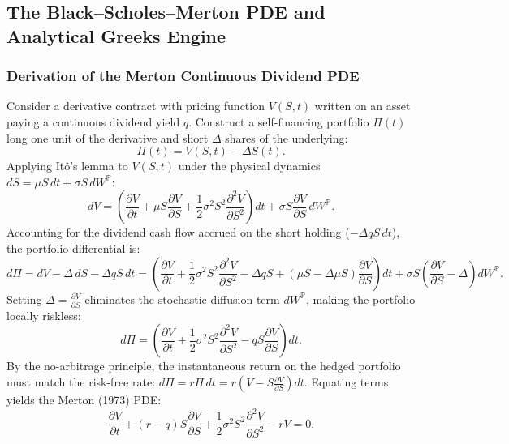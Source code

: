 \documentclass{article}
\theoremstyle{plain}
\theoremstyle{definition}
\theoremstyle{remark}
\begin{document}
\subsection{The Black--Scholes--Merton PDE and Analytical Greeks Engine}

\subsubsection{Derivation of the Merton Continuous Dividend PDE}
Consider a derivative contract with pricing function $V(S, t)$ written on an asset paying a continuous dividend yield $q$. Construct a self-financing portfolio $\Pi(t)$ long one unit of the derivative and short $\Delta$ shares of the underlying:
\begin{equation}
\Pi(t) = V(S, t) - \Delta S(t).
\end{equation}
Applying It\^o's lemma to $V(S,t)$ under the physical dynamics $dS = \mu S\,dt + \sigma S\,dW^\mathbb{P}$:
\begin{equation}
dV = \left(\frac{\partial V}{\partial t} + \mu S\frac{\partial V}{\partial S} + \frac{1}{2}\sigma^2 S^2\frac{\partial^2 V}{\partial S^2}\right)dt + \sigma S\frac{\partial V}{\partial S}\,dW^\mathbb{P}.
\end{equation}
Accounting for the dividend cash flow accrued on the short holding ($-\Delta qS\,dt$), the portfolio differential is:
\begin{equation}
d\Pi = dV - \Delta\,dS - \Delta q S\,dt = \left(\frac{\partial V}{\partial t} + \frac{1}{2}\sigma^2 S^2\frac{\partial^2 V}{\partial S^2} - \Delta q S + (\mu S - \Delta \mu S)\frac{\partial V}{\partial S}\right)dt + \sigma S\left(\frac{\partial V}{\partial S} - \Delta\right)dW^\mathbb{P}.
\end{equation}
Setting $\Delta = \frac{\partial V}{\partial S}$ eliminates the stochastic diffusion term $dW^\mathbb{P}$, making the portfolio locally riskless:
\begin{equation}
d\Pi = \left(\frac{\partial V}{\partial t} + \frac{1}{2}\sigma^2 S^2\frac{\partial^2 V}{\partial S^2} - q S\frac{\partial V}{\partial S}\right)dt.
\end{equation}
By the no-arbitrage principle, the instantaneous return on the hedged portfolio must match the risk-free rate: $d\Pi = r\Pi\,dt = r\left(V - S\frac{\partial V}{\partial S}\right)dt$. Equating terms yields the Merton (1973) PDE:
\begin{equation}
\frac{\partial V}{\partial t} + (r - q)S\frac{\partial V}{\partial S} + \frac{1}{2}\sigma^2 S^2\frac{\partial^2 V}{\partial S^2} - rV = 0.
\end{equation}
\end{document}
